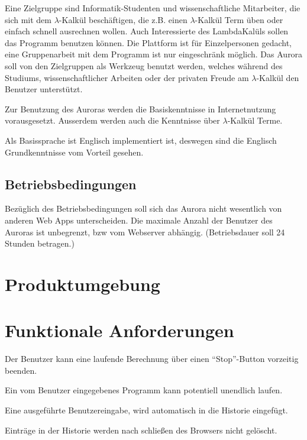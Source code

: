 \documentclass[parskip=full,11pt,twoside]{scrartcl}
\begin{document}
Eine Zielgruppe sind Informatik-Studenten und wissenschaftliche Mitarbeiter, die sich mit dem $\lambda$-Kalkül beschäftigen, die z.B. einen $\lambda$-Kalkül Term  üben oder einfach schnell ausrechnen wollen. Auch Interessierte des LambdaKalüls sollen das Programm benutzen können. Die Plattform ist für Einzelpersonen gedacht, eine Gruppenarbeit mit dem Programm ist nur eingeschränk möglich. Das Aurora soll von den Zielgruppen als Werkzeug benutzt werden, welches während des Studiums, wissenschaftlicher Arbeiten oder der privaten Freude am $\lambda$-Kalkül den Benutzer unterstützt.

Zur Benutzung des Auroras werden die Basiskenntnisse in Internetnutzung vorausgesetzt. Ausserdem werden auch die Kenntnisse über $\lambda$-Kalkül Terme.

Als Basissprache ist Englisch implementiert ist, deswegen sind die Englisch Grundkenntnisse vom Vorteil gesehen.

\subsection{Betriebsbedingungen}
Bezüglich des Betriebsbedingungen soll sich das Aurora nicht wesentlich von anderen Web Apps unterscheiden. Die maximale Anzahl der Benutzer des Auroras ist unbegrenzt, bzw vom Webserver abhängig. (Betriebsdauer soll 24 Stunden betragen.) 


\section{Produktumgebung}



\section{Funktionale Anforderungen}

 
Der Benutzer kann eine laufende Berechnung über einen \enquote{Stop}-Button vorzeitig beenden.

Ein vom Benutzer eingegebenes Programm kann potentiell unendlich laufen.

Eine ausgeführte Benutzereingabe, wird automatisch in die Historie eingefügt.

Einträge in der Historie werden nach schließen des Browsers nicht gelöscht.
\end{document}

